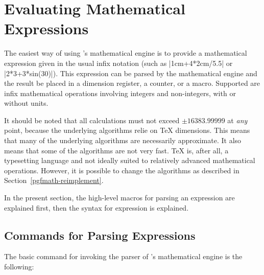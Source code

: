 %
%
%
%

\section{Evaluating Mathematical Expressions}

The easiest way of using \pgfname's mathematical engine is to provide
a mathematical expression given in the usual infix notation (such as
|1cm+4*2cm/5.5| or |2*3+3*sin(30)|). This expression can be parsed by
the mathematical engine and the result be placed in a dimension
register, a counter, or a macro. Supported are infix mathematical
operations involving integers and non-integers, with or without
units.

It should be noted that all 
calculations must not exceed $\pm16383.99999$ at \emph{any} point, 
because the underlying algorithms relie on \TeX{} dimensions. This
means that many of the underlying algorithms are necessarily
approximate. It also means that some of the algorithms are not very
fast. \TeX{} is, after all, a typesetting language and not ideally
suited to relatively advanced mathematical operations. However, it is
possible to change the algorithms as described in
Section~\ref{pgfmath-reimplement}. 

In the present section, the high-level macros for parsing an
expression are explained first, then the syntax for expression is
explained.


\subsection{Commands for Parsing Expressions}

\label{pgfmath-registers}

\label{pgfmath-parsing}

The basic command for invoking the parser of \pgfname's mathematical
engine is the following:

